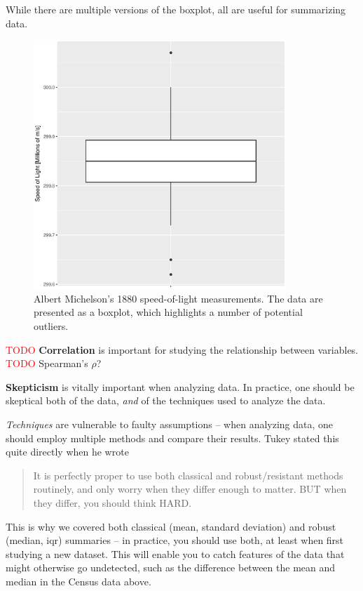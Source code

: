 \documentclass[../primer.tex]{subfiles}
\begin{document}
While there are multiple versions of the boxplot,\cite{frigge1989some} all are
useful for summarizing data.

\begin{figure}[!ht]
  \centering
  \includegraphics[width=0.85\textwidth]{./images/michelson_boxplot}

  \caption{Albert Michelson's 1880 speed-of-light measurements. The data are
    presented as a boxplot, which highlights a number of potential outliers.}
\end{figure}

\textcolor{red}{TODO} \textbf{Correlation} is important for studying the
relationship between variables. \textcolor{red}{TODO} Spearman's $\rho$?

\textbf{Skepticism} is vitally important when analyzing data. In practice, one
should be skeptical both of the data, \emph{and} of the techniques used to
analyze the data.

\emph{Techniques} are vulnerable to faulty assumptions -- when analyzing data,
one should employ multiple methods and compare their results.
Tukey\cite{tukey1979robust} stated this quite directly when he wrote

\begin{quote}
It is perfectly proper to use both classical and robust/resistant methods
routinely, and only worry when they differ enough to matter. BUT when they
differ, you should think HARD.
\end{quote}

This is why we covered both classical (mean, standard deviation) and robust
(median, iqr) summaries -- in practice, you should use both, at least when first
studying a new dataset. This will enable you to catch features of the data that
might otherwise go undetected, such as the difference between the mean and
median in the Census data above.
\end{document}
